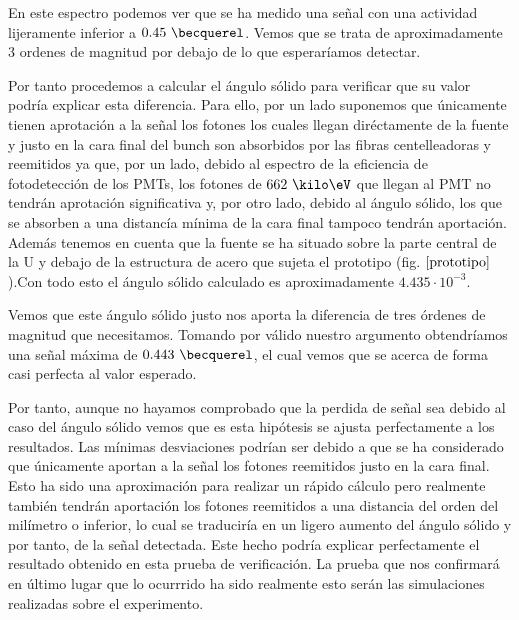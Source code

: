 En este espectro podemos ver que se ha medido una señal con una actividad lijeramente inferior a $0.45~\becquerel$. Vemos que se trata de aproximadamente 3 ordenes de magnitud por debajo de lo que esperaríamos detectar.

Por tanto procedemos a calcular el ángulo sólido para verificar que su valor podría explicar esta diferencia. Para ello, por un lado suponemos que únicamente tienen aprotación a la señal los fotones los cuales llegan diréctamente de la fuente y justo en la cara final del bunch son absorbidos por las fibras centelleadoras y reemitidos ya que, por un lado, debido al espectro de la eficiencia de fotodetección de los PMTs, los fotones de $662~\kilo\eV$ que llegan al PMT no tendrán aprotación significativa y, por otro lado, debido al ángulo sólido, los que se absorben a una distancía mínima de la cara final tampoco tendrán aportación. Además tenemos en cuenta que la fuente se ha situado sobre la parte central de la U y debajo de la estructura de acero que sujeta el prototipo (fig. $\ref{prototipo}$).Con todo esto el ángulo sólido calculado es aproximadamente $4.435 \cdotp 10^{-3}$. 


Vemos que este ángulo sólido justo nos aporta la diferencia de tres órdenes de magnitud que necesitamos. Tomando por válido nuestro argumento obtendríamos una señal máxima de $0.443~\becquerel$, el cual vemos que se acerca de forma casi perfecta al valor esperado.


Por tanto, aunque no hayamos comprobado que la perdida de señal sea debido al caso del ángulo sólido vemos que es esta hipótesis se ajusta perfectamente a los resultados. Las mínimas desviaciones podrían ser debido a que se ha considerado que únicamente aportan a la señal los fotones reemitidos justo en la cara final. Esto ha sido una aproximación para realizar un rápido cálculo pero realmente también tendrán aportación los fotones reemitidos a una distancia del orden del milímetro o inferior, lo cual se traduciría en un ligero aumento del ángulo sólido y por tanto, de la señal detectada. Este hecho podría explicar perfectamente el resultado obtenido en esta prueba de verificación. La prueba que nos confirmará en último lugar que lo ocurrrido ha sido realmente esto serán las simulaciones realizadas sobre el experimento.
